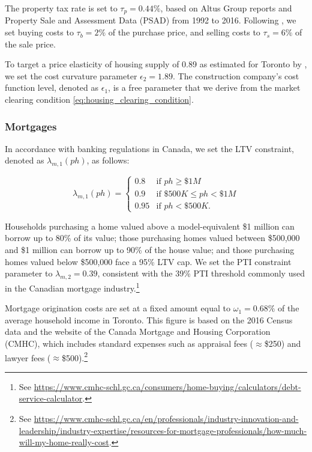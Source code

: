 \documentclass[parskip=full]{article}
\begin{document}
The property tax rate is set to $\tau_p=0.44\%$, based on Altus Group reports and Property Sale and Assessment Data (PSAD) from 1992 to 2016. Following \citet{gm-2003}, we set buying costs to $\tau_{b}=2\%$ of the purchase price, and selling costs to $\tau_{s}=6\% $ of the sale price.

To target a price elasticity of housing supply of 0.89 as estimated for Toronto by \citet{piaxao-2021}, we set the cost curvature parameter $\epsilon_{2}=1.89$. The construction company's cost function level, denoted as $\epsilon_1$, is a free parameter that we derive from the market clearing condition \eqref{eq:housing_clearing_condition}.

\subsubsection{Mortgages}

In accordance with banking regulations in Canada, we set the LTV constraint, denoted as $\lambda_{m,1}(ph)$, as follows:

\begin{equation*}
\lambda_{m,1}(ph) = \begin{cases}
0.8 &\text{if $ph\geq \$1M$}\\
0.9 &\text{if $\$500K\leq ph< \$1M$}\\
0.95 &\text{if $ph < \$500K$}.
\end{cases}
\end{equation*}

\noindent Households purchasing a home valued above a model-equivalent \$1 million can borrow up to 80\% of its value; those purchasing homes valued between \$500,000 and \$1 million can borrow up to 90\% of the house value; and those purchasing homes valued below \$500,000 face a 95\% LTV cap. We set the PTI constraint parameter to $\lambda_{m,2}=0.39$, consistent with the 39\% PTI threshold commonly used in the Canadian mortgage industry.\footnote{See \url{https://www.cmhc-schl.gc.ca/consumers/home-buying/calculators/debt-service-calculator}.}

Mortgage origination costs are set at a fixed amount equal to $\omega_{1}=0.68\%$ of the average household income in Toronto. This figure is based on the 2016 Census data and the website of the Canada Mortgage and Housing Corporation (CMHC), which includes standard expenses such as appraisal fees ($\approx$\$250) and lawyer fees ($\approx$\$500).\footnote{See \url{https://www.cmhc-schl.gc.ca/en/professionals/industry-innovation-and-leadership/industry-expertise/resources-for-mortgage-professionals/how-much-will-my-home-really-cost}.}
\end{document}
